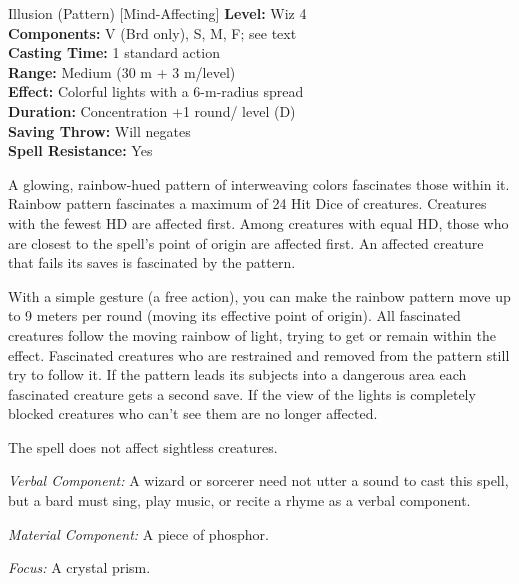{Illusion (Pattern) [Mind-Affecting]}
{
	\textbf{Level:}
	Wiz 4\\
	\textbf{Components:}
	V (Brd only), S, M, F; see text\\
	\textbf{Casting Time:}
	1 standard action\\
	\textbf{Range:}
	Medium (30 m + 3 m/level)\\
	\textbf{Effect:}
	Colorful lights with a 6-m-radius spread\\
	\textbf{Duration:}
	Concentration +1 round/ level (D)\\
	\textbf{Saving Throw:}
	Will negates\\
	\textbf{Spell Resistance:}
	Yes\\
}
{
	A glowing, rainbow-hued pattern of interweaving colors fascinates those within it. Rainbow pattern fascinates a maximum of 24 Hit Dice of creatures. Creatures with the fewest HD are affected first. Among creatures with equal HD, those who are closest to the spell's point of origin are affected first. An affected creature that fails its saves is fascinated by the pattern.

	With a simple gesture (a free action), you can make the rainbow pattern move up to 9 meters per round (moving its effective point of origin). All fascinated creatures follow the moving rainbow of light, trying to get or remain within the effect. Fascinated creatures who are restrained and removed from the pattern still try to follow it. If the pattern leads its subjects into a dangerous area each fascinated creature gets a second save. If the view of the lights is completely blocked creatures who can't see them are no longer affected.

	The spell does not affect sightless creatures.

	\textit{Verbal Component:}
	A wizard or sorcerer need not utter a sound to cast this spell, but a bard must sing, play music, or recite a rhyme as a verbal component.

	\textit{Material Component:}
	A piece of phosphor.

	\textit{Focus:}
	A crystal prism.

}

